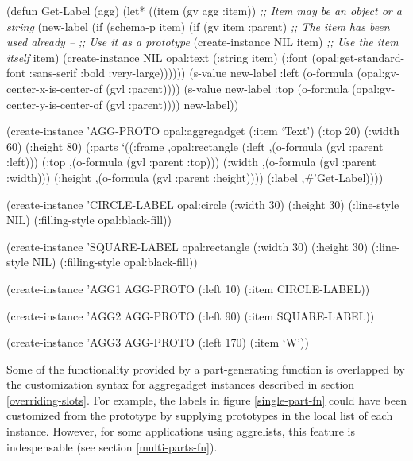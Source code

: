 \begin{programexample}
(defun Get-Label (agg)
  (let* ((item (gv agg :item))
         {\it ;; Item may be an object or a string}
	 (new-label (if (schema-p item)
			(if (gv item :parent)
			    {\it ;; The item has been used already --}
			    {\it ;; Use it as a prototype}
			    (create-instance NIL item)
			    {\it ;; Use the item itself}
			    item)
		        (create-instance NIL opal:text
			  (:string item)
			  (:font (opal:get-standard-font
                                  :sans-serif :bold :very-large))))))
    (s-value new-label :left (o-formula (opal:gv-center-x-is-center-of (gvl :parent))))
    (s-value new-label :top (o-formula (opal:gv-center-y-is-center-of (gvl :parent))))
    new-label))

(create-instance 'AGG-PROTO opal:aggregadget
  (:item `Text')
  (:top 20) (:width 60) (:height 80)
  (:parts
   `((:frame ,opal:rectangle
	     (:left ,(o-formula (gvl :parent :left)))
	     (:top ,(o-formula (gvl :parent :top)))
	     (:width ,(o-formula (gvl :parent :width)))
	     (:height ,(o-formula (gvl :parent :height))))
     (:label ,\#'Get-Label))))

(create-instance 'CIRCLE-LABEL opal:circle
  (:width 30) (:height 30)
  (:line-style NIL)
  (:filling-style opal:black-fill))

(create-instance 'SQUARE-LABEL opal:rectangle
  (:width 30) (:height 30)
  (:line-style NIL)
  (:filling-style opal:black-fill))

(create-instance 'AGG1 AGG-PROTO
  (:left 10)
  (:item CIRCLE-LABEL))

(create-instance 'AGG2 AGG-PROTO
  (:left 90)
  (:item SQUARE-LABEL))

(create-instance 'AGG3 AGG-PROTO
  (:left 170)
  (:item `W'))
\end{programexample}

Some of the functionality provided by a part-generating function is
overlapped by the customization syntax for aggregadget instances
described in section \ref{overriding-slots}.  For example, the labels
in figure \ref{single-part-fn} could have been customized from the
prototype by supplying prototypes in the local  list of
each instance.  However, for some applications using aggrelists, this
feature is indespensable (see section \ref{multi-parts-fn}).


